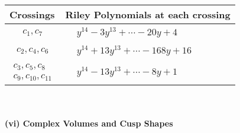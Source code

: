 \documentclass[1p]{elsarticle_modified}
\theoremstyle{definition}
\begin{document}
\begin{tabular}{m{50pt}|m{274pt}}
Crossings & \hspace{64pt}Riley Polynomials at each crossing \\
\hline $$\begin{aligned}c_{1},c_{7}\end{aligned}$$&$\begin{aligned}
&y^{14}-3 y^{13}+\cdots-20 y+4
\end{aligned}$\\
\hline $$\begin{aligned}c_{2},c_{4},c_{6}\end{aligned}$$&$\begin{aligned}
&y^{14}+13 y^{13}+\cdots-168 y+16
\end{aligned}$\\
\hline $$\begin{aligned}c_{3},c_{5},c_{8}\\c_{9},c_{10},c_{11}\end{aligned}$$&$\begin{aligned}
&y^{14}-13 y^{13}+\cdots-8 y+1
\end{aligned}$\\
\hline
\end{tabular}\\~\\
\newpage\flushleft \textbf{(vi) Complex Volumes and Cusp Shapes}
\end{document}
